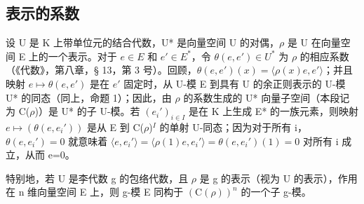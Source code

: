 \subsection{表示的系数}

设 U 是 K 上带单位元的结合代数，U* 是向量空间 U 的对偶，\(\rho\) 是 U 在向量空间 E 上的一个表示。对于 \(e \in E\) 和 \(e' \in E^*\)，令 \(\theta(e, e') \in U^*\) 为 \(\rho\) 的相应系数（《代数》，第八章，§ 13，第 3 号）。回顾，\(\theta(e, e')(x) = \langle \rho(x)e, e' \rangle\)；并且映射 \(e \mapsto \theta(e, e')\) 是在 \(e'\) 固定时，从 U-模 E 到具有 U 的余正则表示的 U-模 U* 的同态（同上，命题 1）；因此，由 \(\rho\) 的系数生成的 U* 向量子空间（本段记为 C(\(\rho\))）是 U* 的子 U-模。若 \((e_i')_{i \in I}\) 是在 K 上生成 E* 的一族元素，则映射 \(e \mapsto (\theta(e, e_i'))\) 是从 E 到 C(\(\rho\))\(^{I}\) 的单射 U-同态；因为对于所有 i，\(\theta(e, e_i') = 0\) 就意味着 \(\langle e, e_i' \rangle = \langle \rho(1)e, e_i' \rangle = \theta(e, e_i')(1) = 0\) 对所有 i 成立，从而 e=0。

特别地，若 U 是李代数 g 的包络代数，且 \(\rho\) 是 g 的表示（视为 U 的表示），作用在 n 维向量空间 E 上，则 g-模 E 同构于 \((\mathrm{C}(\rho))^{n}\) 的一个子 g-模。

